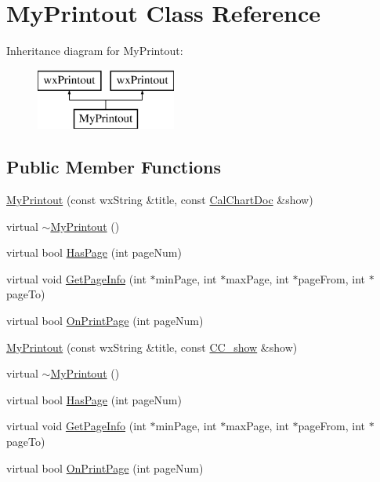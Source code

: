 \hypertarget{a00113}{\section{My\-Printout Class Reference}
\label{a00113}
}
Inheritance diagram for My\-Printout\-:\begin{figure}[H]
\begin{center}
\leavevmode
\includegraphics[height=2.000000cm]{a00113}
\end{center}
\end{figure}
\subsection*{Public Member Functions}
\begin{DoxyCompactItemize}
\item 
\hyperlink{a00113_a5d56a1836656626025ef46e076b8c0c7}{My\-Printout} (const wx\-String \&title, const \hyperlink{a00020}{Cal\-Chart\-Doc} \&show)
\item 
virtual \hyperlink{a00113_a209d1761f68b757d8188e2ebd0bd51a0}{$\sim$\-My\-Printout} ()
\item 
virtual bool \hyperlink{a00113_ad5e2790e0b40c65e2dc43f76207fe548}{Has\-Page} (int page\-Num)
\item 
virtual void \hyperlink{a00113_a9a643de3378ca9f6e490e93b7149ec83}{Get\-Page\-Info} (int $\ast$min\-Page, int $\ast$max\-Page, int $\ast$page\-From, int $\ast$page\-To)
\item 
virtual bool \hyperlink{a00113_a5484719679cb75aa09e9959c3d4af35f}{On\-Print\-Page} (int page\-Num)
\item 
\hyperlink{a00113_aa1ed90eae4c15bc590b7d528bed8c09f}{My\-Printout} (const wx\-String \&title, const \hyperlink{a00046}{C\-C\-\_\-show} \&show)
\item 
virtual \hyperlink{a00113_a209d1761f68b757d8188e2ebd0bd51a0}{$\sim$\-My\-Printout} ()
\item 
virtual bool \hyperlink{a00113_ad5e2790e0b40c65e2dc43f76207fe548}{Has\-Page} (int page\-Num)
\item 
virtual void \hyperlink{a00113_a9a643de3378ca9f6e490e93b7149ec83}{Get\-Page\-Info} (int $\ast$min\-Page, int $\ast$max\-Page, int $\ast$page\-From, int $\ast$page\-To)
\item 
virtual bool \hyperlink{a00113_a5484719679cb75aa09e9959c3d4af35f}{On\-Print\-Page} (int page\-Num)
\end{DoxyCompactItemize}
